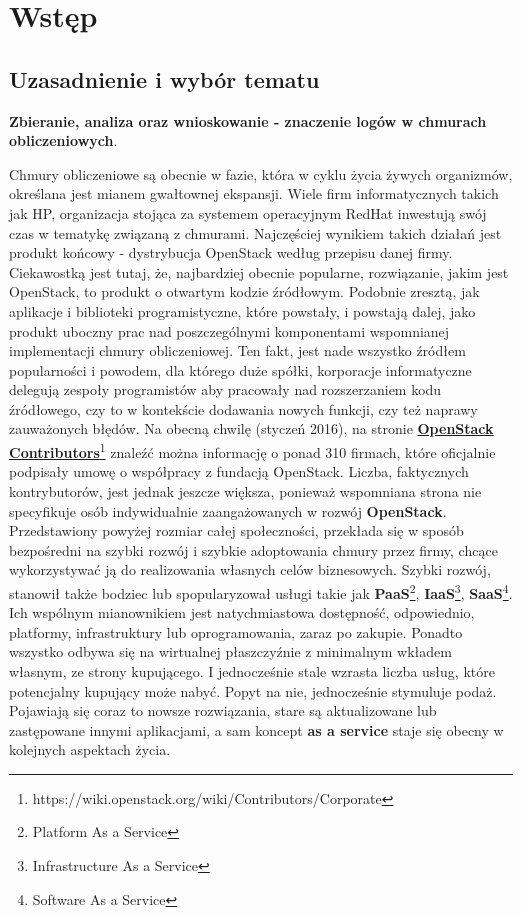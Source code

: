 \chapter[Wstęp]{Wstęp}
\label{chapter:introduction}

\section{Uzasadnienie i wybór tematu}

\textbf{Zbieranie, analiza oraz wnioskowanie - znaczenie logów w chmurach obliczeniowych}. 

Chmury obliczeniowe są obecnie w fazie, która w cyklu życia żywych organizmów, określana jest mianem gwałtownej ekspansji. Wiele firm
informatycznych takich jak HP, organizacja stojąca za systemem operacyjnym RedHat inwestują swój czas w tematykę związaną z chmurami.
Najczęściej wynikiem takich działań jest produkt końcowy - dystrybucja OpenStack według przepisu danej firmy. Ciekawostką jest tutaj,
że, najbardziej obecnie popularne, rozwiązanie, jakim jest OpenStack, to produkt o otwartym kodzie źródłowym. Podobnie zresztą, jak
aplikacje i biblioteki programistyczne, które powstały, i powstają dalej, jako produkt uboczny prac nad poszczególnymi komponentami
wspomnianej implementacji chmury obliczeniowej. Ten fakt, jest nade wszystko źródłem popularności i powodem, dla którego duże spółki, 
korporacje informatyczne delegują zespoły programistów aby pracowały nad rozszerzaniem kodu źródłowego, czy to w kontekście
dodawania nowych funkcji, czy też naprawy zauważonych błędów. Na obecną chwilę (styczeń 2016), na stronie \href{https://wiki.openstack.org/wiki/Contributors/Corporate}{\textbf{OpenStack Contributors}}\footnote{https://wiki.openstack.org/wiki/Contributors/Corporate}
znaleźć można informację o ponad 310 firmach, które oficjalnie podpisały umowę o współpracy z fundacją OpenStack. Liczba, faktycznych kontrybutorów,
jest jednak jeszcze większa, ponieważ wspomniana strona nie specyfikuje osób indywidualnie zaangażowanych w rozwój \textbf{OpenStack}.
Przedstawiony powyżej rozmiar całej społeczności, przekłada się w sposób bezpośredni na szybki rozwój i szybkie adoptowania chmury przez firmy, chcące wykorzystywać ją do realizowania własnych celów biznesowych. Szybki rozwój, stanowił także bodziec lub spopularyzował usługi takie jak
\textbf{PaaS}\footnote{Platform As a Service},
\textbf{IaaS}\footnote{Infrastructure As a Service},
\textbf{SaaS}\footnote{Software As a Service}.
Ich wspólnym mianownikiem jest natychmiastowa dostępność, odpowiednio, platformy, infrastruktury lub oprogramowania, zaraz po zakupie. Ponadto wszystko
odbywa się na wirtualnej płaszczyźnie z minimalnym wkładem własnym, ze strony kupującego. I jednocześnie stale wzrasta liczba usług, które
potencjalny kupujący może nabyć. Popyt na nie, jednocześnie stymuluje podaż. Pojawiają się coraz to nowsze rozwiązania, stare są aktualizowane lub
zastępowane innymi aplikacjami, a sam koncept \textbf{as a service} staje się obecny w kolejnych aspektach życia. 

